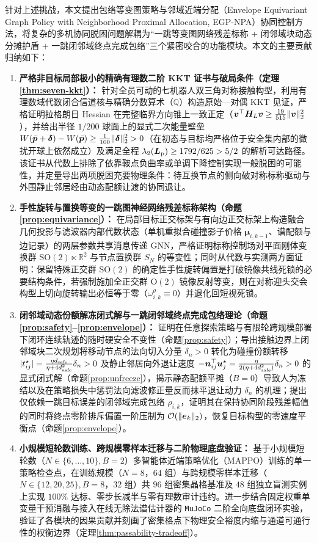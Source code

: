 针对上述挑战，本文提出包络等变图策略与邻域近端分配（Envelope Equivariant Graph Policy with Neighborhood Proximal Allocation, EGP-NPA）协同控制方法，将复杂的多机协同脱困问题解耦为“一跳等变图网络残差标称 + 闭邻域块动态分摊护盾 + 一跳闭邻域终点完成包络”三个紧密咬合的功能模块。本文的主要贡献归纳如下：
\begin{enumerate}
 \item \textbf{严格非目标局部极小的精确有理数二阶 KKT 证书与破局条件（定理\ref{thm:seven-kkt}）：} 针对全员可动的七机器人双三角对称接触构型，利用有理数域代数闭合信道核与精确分数算术（$\mathbb Q$）构造原始—对偶 KKT 见证，严格证明拉格朗日 Hessian 在完整临界方向锥上一致正定（$\boldsymbol v^{\top}\boldsymbol H_L\boldsymbol v\ge\frac{19}{515}\lVert\boldsymbol v\rVert_2^2$），并给出半径 $1/200$ 球面上的显式二次能量壁垒 $W(\bar{\boldsymbol{p}}+\boldsymbol\delta)-W(\bar{\boldsymbol{p}})\ge\frac1{100}\lVert\boldsymbol\delta\rVert_2^2>0$（在初态与目标均严格位于安全集内部的微扰开球上依然成立）及满足全程 $\lambda_2(\boldsymbol{L}_{\mathrm{p}})\ge 1792/625>5/2$ 的解析可达路径。该证书从代数上排除了依靠鞍点负曲率或单调下降控制实现一般脱困的可能性，并定量导出两项脱困充要物理条件：待互换节点的侧向破对称标称驱动与外围静止邻居经由动态配额让渡的协同退让。
 \item \textbf{手性旋转与置换等变的一跳图神经网络残差标称架构（命题\ref{prop:equivariance}）：} 在局部目标正交标架与有向边正交标架上构造融合几何投影与滤波器内部代数状态（单机重拟合碰撞影子价格 $\boldsymbol\mu_{i,k-1}$、谱配额与边记录）的两层参数共享消息传递 GNN，严格证明标称控制场对平面刚体变换群 $\mathrm{SO}(2)\ltimes\mathbb R^2$ 与节点置换群 $S_N$ 的等变性；同时从代数与实测两方面证明：保留特殊正交群 $\mathrm{SO}(2)$ 的确定性手性旋转偏置是打破镜像共线死锁的必要结构条件，若强制施加全正交群 $\mathrm{O}(2)$ 镜像反射等变，则在对称迎头交会构型上切向旋转输出必恒等于零（$\omega_{i,k}^\theta\equiv 0$）并退化回短视死锁。
 \item \textbf{闭邻域动态份额解冻闭式解与一跳闭邻域终点完成包络理论（命题\ref{prop:safety}--\ref{prop:envelope}）：} 证明在任意探索策略与有限轮跨规模部署下闭环连续轨迹的随时硬安全不变性（命题\ref{prop:safety}）；导出接触边界上闭邻域块二次规划将移动节点的法向切入分量 $\delta_n>0$ 转化为碰撞份额转移 $|t_{ij}^\star|=\frac{\eta d_{\mathrm{safe}}}{\eta+4d_{\mathrm{safe}}^2}\delta_n>0$ 及静止邻居向外退让速度 $-\boldsymbol n_{ij}^{\top}\boldsymbol{u}_j^\star=\frac{\eta}{2(\eta+4d_{\mathrm{safe}}^2)}\delta_n>0$ 的显式闭式解（命题\ref{prop:unfreeze}），揭示静态配额平摊（$B=0$）导致人为冻结以及在策略损失中惩罚法向滤波修正量反而抹平退让动力 $\delta_n$ 的机理；提出仅依赖一跳目标误差的闭邻域完成包络 $\rho_{i,k}$，证明其在保持协同阶段残差幅值的同时将终点零阶排斥偏置一阶压制为 $\mathcal O(\lVert\boldsymbol{e}_k\rVert_2)$，恢复目标构型的零速度平衡点（命题\ref{prop:envelope}）。
 \item \textbf{小规模短轮数训练、跨规模零样本迁移与二阶物理底盘验证：} 基于小规模短轮数（$N\in\{6,\dots,10\},B=2$）多智能体近端策略优化（MAPPO）训练的单一策略检查点，在训练规模（$N=8$，$64$ 组）与跨规模零样本迁移（$N\in\{12,20,25\},B=8$，$32$ 组）共 $96$ 组密集晶格基准及 $48$ 组独立盲测实例上实现 $100\%$ 达标、零步长减半与零有理数审计违约。进一步结合固定权重单变量干预消融与接入在线无除法谱估计器的 \texttt{MuJoCo} 二阶全向底盘闭环实验，验证了各模块的因果贡献并刻画了密集格点下物理安全裕度内缩与通道可通行性的权衡边界（定理\ref{thm:passability-tradeoff}）。
\end{enumerate}

